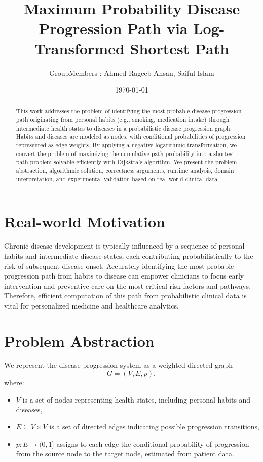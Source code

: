 \documentclass[11pt]{article}
\title{Maximum Probability Disease Progression Path via Log-Transformed Shortest Path}
\author{GroupMembers : Ahmed Rageeb Ahsan, Saiful Islam}
\date{\today}
\begin{document}
\maketitle

\begin{abstract}
This work addresses the problem of identifying the most probable disease progression path originating from personal habits (e.g., smoking, medication intake) through intermediate health states to diseases in a probabilistic disease progression graph. Habits and diseases are modeled as nodes, with conditional probabilities of progression represented as edge weights. By applying a negative logarithmic transformation, we convert the problem of maximizing the cumulative path probability into a shortest path problem solvable efficiently with Dijkstra's algorithm. We present the problem abstraction, algorithmic solution, correctness arguments, runtime analysis, domain interpretation, and experimental validation based on real-world clinical data.
\end{abstract}

\section{Real-world Motivation}
Chronic disease development is typically influenced by a sequence of personal habits and intermediate disease states, each contributing probabilistically to the risk of subsequent disease onset. Accurately identifying the most probable progression path from habits to disease can empower clinicians to focus early intervention and preventive care on the most critical risk factors and pathways. Therefore, efficient computation of this path from probabilistic clinical data is vital for personalized medicine and healthcare analytics.

\section{Problem Abstraction}
We represent the disease progression system as a weighted directed graph
\[
G = (V, E, p),
\]
where:
\begin{itemize}
    \item \(V\) is a set of nodes representing health states, including personal habits and diseases,
    \item \(E \subseteq V \times V\) is a set of directed edges indicating possible progression transitions,
    \item \(p: E \to (0,1]\) assigns to each edge the conditional probability of progression from the source node to the target node, estimated from patient data.
\end{itemize}
\end{document}
